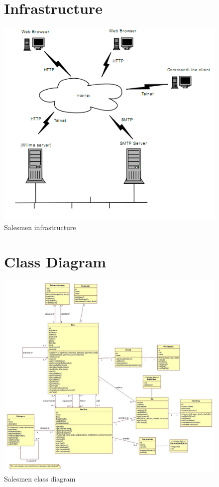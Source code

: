 \documentclass[a4paper, 12pt]{report}
\begin{document}
\begin{figure}
\section{Infrastructure}
\label{fig_infrastructure}
\includegraphics[scale=0.8]{../../img/infra1.png}
\caption{Salesmen infrastructure}
\end{figure}

\begin{figure}
\section{Class Diagram}
\label{fig_class}
\includegraphics[scale=0.4,angle=90]{../../img/class1.jpg}
\caption{Salesmen class diagram}
\end{figure}
\end{document}
